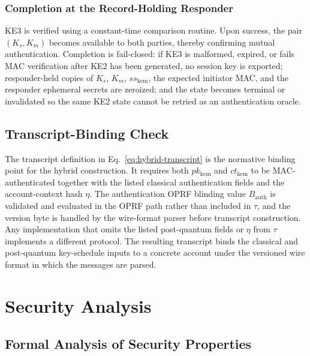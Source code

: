\documentclass[preprint,12pt]{elsarticle}
\theoremstyle{remark}
\begin{document}
\subsubsection{Completion at the Record-Holding Responder}

KE3 is verified using a constant-time comparison routine. Upon success,
the pair $(K_s, K_m)$ becomes available to both parties, thereby
confirming mutual authentication. Completion is fail-closed: if KE3 is
malformed, expired, or fails MAC verification after KE2 has been
generated, no session key is exported; responder-held copies of $K_s$,
$K_m$, $ss_{\mathrm{kem}}$, the expected initiator MAC, and the
responder ephemeral secrets are zeroized; and the state becomes
terminal or invalidated so the same KE2 state cannot be retried as an
authentication oracle.

\subsection{Transcript-Binding Check}

The transcript definition in Eq.~\eqref{eq:hybrid-transcript} is the
normative binding point for the hybrid construction. It requires both
$pk_{\mathrm{kem}}$ and $ct_{\mathrm{kem}}$ to be MAC-authenticated
together with the listed classical authentication fields and the
account-context hash $\eta$. The authentication OPRF blinding value
$B_{\mathrm{auth}}$ is validated and evaluated in the OPRF path rather
than included in $\tau$, and the version byte is handled by the
wire-format parser before transcript construction. Any implementation
that omits the listed post-quantum fields or $\eta$ from $\tau$
implements a different protocol. The resulting transcript binds the
classical and post-quantum key-schedule inputs to a concrete account
under the versioned wire format in which the messages are parsed.

\section{Security Analysis}

\subsection{Formal Analysis of Security Properties}
\end{document}

